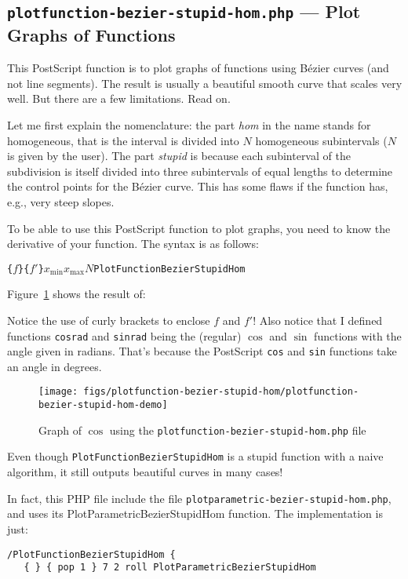 \documentclass[10pt,a4paper]{scrartcl}
\newcommand\PS{PostScript}
\begin{document}
\subsection{\texttt{plotfunction-bezier-stupid-hom.php} --- Plot Graphs of Functions}
\label{ssec:plotfunction-bezier-stupid-hom.php}
This \PS{} function is to plot graphs of functions using B\'ezier curves (and not
line segments). The result is usually a beautiful smooth curve that scales very
well. But there are a few limitations. Read on.

Let me first explain the nomenclature: the part \emph{hom} in the name stands
for homogeneous, that is the interval is divided into $N$ homogeneous
subintervals ($N$ is given by the user). The part \emph{stupid} is because each subinterval
of the subdivision is itself divided into three subintervals of equal lengths to determine
the control points for the B\'ezier curve. This has some flaws if the function has, e.g.,
very steep slopes.

To be able to use this \PS{} function to plot graphs, you need to know the derivative of your function.
The syntax is as follows:
\begin{center}
\texttt{\{}$f$\texttt{\}}\quad\texttt{\{}$f'$\texttt{\}}\quad$x_{\text{min}}$\quad$x_{\text{max}}$\quad$N$\quad\texttt{PlotFunctionBezierStupidHom}
\end{center}

Figure~\ref{fig:plotfunction-bezier-stupid-hom-demo} shows the result of:

Notice the use of curly brackets to enclose $f$ and $f'$! Also notice that I
defined functions \texttt{cosrad} and \texttt{sinrad} being the (regular)
$\cos$ and $\sin$ functions with the angle given in radians. That's because the
\PS{} \texttt{cos} and \texttt{sin} functions take an angle in degrees.

\begin{figure}[ht!]%
\centering
\texttt{[image: figs/plotfunction-bezier-stupid-hom/plotfunction-bezier-stupid-hom-demo]}%
\caption{Graph of $\cos$ using the \texttt{plotfunction-bezier-stupid-hom.php} file}%
\label{fig:plotfunction-bezier-stupid-hom-demo}%
\end{figure}

Even though \texttt{PlotFunctionBezierStupidHom} is a stupid function with a
naive algorithm, it still outputs beautiful curves in many cases!

In fact, this PHP file include the file \texttt{plotparametric-bezier-stupid-hom.php},
and uses its PlotParametricBezierStupidHom function. The implementation is just:
\begin{lstlisting}
/PlotFunctionBezierStupidHom {
   { } { pop 1 } 7 2 roll PlotParametricBezierStupidHom
\end{lstlisting}
\end{document}
